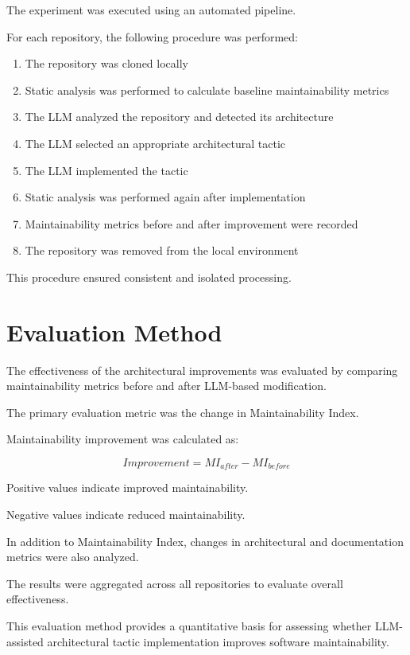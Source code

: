 The experiment was executed using an automated pipeline.

For each repository, the following procedure was performed:

\begin{enumerate}
\item The repository was cloned locally
\item Static analysis was performed to calculate baseline maintainability metrics
\item The LLM analyzed the repository and detected its architecture
\item The LLM selected an appropriate architectural tactic
\item The LLM implemented the tactic
\item Static analysis was performed again after implementation
\item Maintainability metrics before and after improvement were recorded
\item The repository was removed from the local environment
\end{enumerate}

This procedure ensured consistent and isolated processing.

\section{Evaluation Method}

The effectiveness of the architectural improvements was evaluated by comparing maintainability metrics before and after LLM-based modification.

The primary evaluation metric was the change in Maintainability Index.

Maintainability improvement was calculated as:

\begin{equation}
Improvement = MI_{after} - MI_{before}
\end{equation}

Positive values indicate improved maintainability.

Negative values indicate reduced maintainability.

In addition to Maintainability Index, changes in architectural and documentation metrics were also analyzed.

The results were aggregated across all repositories to evaluate overall effectiveness.

This evaluation method provides a quantitative basis for assessing whether LLM-assisted architectural tactic implementation improves software maintainability.
